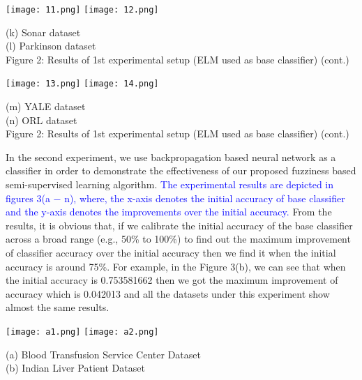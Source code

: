 \documentclass{article}
\begin{document}
		\vspace{0.9em}
		\texttt{[image: 11.png]}
		\texttt{[image: 12.png]}
		\begin{center}
			\small (k) Sonar dataset\\
			\vspace{0.5em}(l) Parkinson dataset\\
			\vspace{0.9em}
			Figure 2: Results of 1st experimental setup (ELM used as base classifier) (cont.)
		\end{center}
		
		
		
		\newpage
		\texttt{[image: 13.png]}
		\texttt{[image: 14.png]}
		\begin{center}
			\small (m) YALE dataset\\
			\vspace{0.5em}(n) ORL dataset\\
			\vspace{0.9em}
			Figure 2: Results of 1st experimental setup (ELM used as base classifier) (cont.)\\\vspace{0.5em}
		\end{center} 			
			
		\vspace{0.2cm}
		\hspace{0.2cm}In the second experiment, we use backpropagation based neural network as a
		 classifier in order to demonstrate the effectiveness of our proposed fuzziness based
		  semi-supervised learning algorithm. \textcolor{blue}{The experimental results are depicted in figures 3(a $-$ n), where, the x-axis denotes the initial accuracy of base classifier and the y-axis denotes the improvements over the initial accuracy.}  From the results, it is obvious that, if we calibrate the initial accuracy of the base classifier across a broad range (e.g., 50\% to 100\%) to find out the maximum improvement of classifier accuracy over the initial accuracy then we find it when the initial accuracy is around 75\%. For example, in the Figure 3(b), we can see that when the initial accuracy is 0.753581662 then we got the maximum improvement of accuracy which is 0.042013 and all the datasets under this experiment show almost the same results.
		  
		  
		  
		  \newpage
		  \texttt{[image: a1.png]}
		  \texttt{[image: a2.png]}
		  \begin{center}
		  	\small (a) Blood Transfusion Service Center Dataset\\
		  	\vspace{0.5em}(b) Indian Liver Patient Dataset
		  \end{center}
		  
\end{document}
